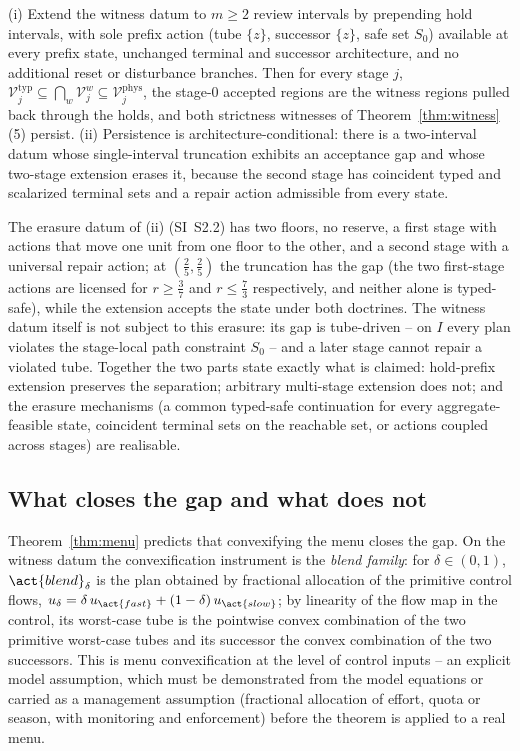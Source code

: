 \begin{proposition}\label{prop:persist}
\textup{(i)} Extend the witness datum to $m\ge2$ review intervals by prepending hold intervals, with sole prefix action  (tube $\{z\}$, successor $\{z\}$, safe set $S_0$) available at every prefix state, unchanged terminal and successor architecture, and no additional reset or disturbance branches. Then for every stage $j$, $\mathcal V^{\mathrm{typ}}_j\subseteq\bigcap_{w}\mathcal V^{w}_j\subseteq\mathcal V^{\mathrm{phys}}_j$, the stage-0 accepted regions are the witness regions pulled back through the holds, and both strictness witnesses of Theorem~\ref{thm:witness}(5) persist.
\textup{(ii)} Persistence is architecture-conditional: there is a two-interval datum whose single-interval truncation exhibits an acceptance gap and whose two-stage extension erases it, because the second stage has coincident typed and scalarized terminal sets and a repair action admissible from every state.
\end{proposition}

The erasure datum of (ii) (SI~S2.2) has two floors, no reserve, a first stage with actions that move one unit from one floor to the other, and a second stage with a universal repair action; at $(\tfrac25,\tfrac25)$ the truncation has the gap (the two first-stage actions are licensed for $r\ge\tfrac37$ and $r\le\tfrac73$ respectively, and neither alone is typed-safe), while the extension accepts the state under both doctrines. The witness datum itself is not subject to this erasure: its gap is tube-driven -- on $I$ every plan violates the stage-local path constraint $S_0$ -- and a later stage cannot repair a violated tube. Together the two parts state exactly what is claimed: hold-prefix extension preserves the separation; arbitrary multi-stage extension does not; and the erasure mechanisms (a common typed-safe continuation for every aggregate-feasible state, coincident terminal sets on the reachable set, or actions coupled across stages) are realisable.

\subsection{What closes the gap and what does not}\label{sec:closing}

Theorem~\ref{thm:menu} predicts that convexifying the menu closes the gap. On the witness datum the convexification instrument is the \emph{blend family}: for $\delta\in(0,1)$, $\act{blend}_\delta$ is the plan obtained by fractional allocation of the primitive control flows, $u_\delta=\delta\,u_{\act{fast}}+(1-\delta)\,u_{\act{slow}}$; by linearity of the flow map in the control, its worst-case tube is the pointwise convex combination of the two primitive worst-case tubes and its successor the convex combination of the two successors. This is menu convexification at the level of control inputs -- an explicit model assumption, which must be demonstrated from the model equations or carried as a management assumption (fractional allocation of effort, quota or season, with monitoring and enforcement) before the theorem is applied to a real menu.


